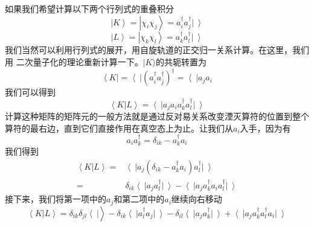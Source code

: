 \documentclass[12pt,a4paper,openany,twoside]{book}
\numberwithin{equation}{section}
\begin{document}
      如果我们希望计算以下两个行列式的重叠积分
      \begin{equation}
          \left|K\right\rangle=\left|\chi_i\chi_j\right\rangle=a_i^\dagger a_j^\dagger\left|\ \right\rangle
      \end{equation}
      \begin{equation}
          \left|L\right\rangle=\left|\chi_k\chi_l\right\rangle=a_k^\dagger a_l^\dagger\left|\ \right\rangle
      \end{equation}
      我们当然可以利用行列式的展开，用自旋轨道的正交归一关系计算。在这里，我们用  二次量子化的理论重新计算一下。$|K\rangle$的共轭转置为
      \begin{equation}
          \left\langle K\right|=\left\langle\ \right|(a_i^\dagger a_j^\dagger)^\dagger
          =\left\langle\ \right|a_j a_i
      \end{equation}
      我们可以得到
      \begin{equation}
          \left\langle K\right|\left.L\right\rangle=\left\langle\ \right|a_j a_i
          a_k^\dagger a_l^\dagger\left|\ \right\rangle
      \end{equation}
      计算这种矩阵的矩阵元的一般方法就是通过反对易关系改变湮灭算符的位置到整个算符的最右边，直到它们直接作用在真空态上为止。让我们从$a_i$入手，因为有
      \begin{equation}
          a_i a_k^\dagger=\delta_{ik}-a_k^\dagger a_i
      \end{equation}
      我们得到
      \begin{equation}
          \begin{aligned}
              \left\langle K\right|\left.L\right\rangle
              =&\left\langle\ \right|a_j\left(\delta_{ik}-a_k^\dagger a_i\right)a_l^\dagger\left|\ \right\rangle\\
              =&\delta_{ik}\left\langle\ \right|a_j a_l^\dagger\left|\ \right\rangle-
              \left\langle\ \right|a_j a_k^\dagger a_i a_l^\dagger\left|\ \right\rangle
          \end{aligned}
      \end{equation}
      接下来，我们将第一项中的$a_j$和第二项中的$a_i$继续向右移动
      \begin{equation}
          \left\langle K\right|\left.L\right\rangle=\delta_{ik}\delta_{jl}\left\langle\ \right|\left.\right\rangle
          -\delta_{ik} \left\langle\ \right|a_l^\dagger a_j\left|\ \right\rangle
          -\delta_{il} \left\langle\ \right|a_j a_k^\dagger\left|\ \right\rangle
          +\left\langle\ \right|a_j a_k^\dagger a_l^\dagger a_i\left|\ \right\rangle
      \end{equation}
\end{document}

